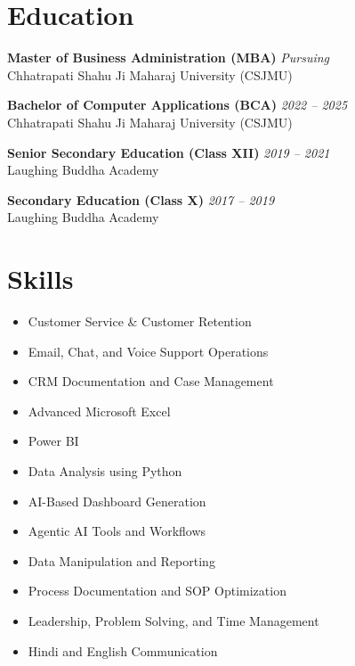\documentclass[11pt,a4paper]{article}
\begin{document}
\section*{Education}

\textbf{Master of Business Administration (MBA)} \hfill \textit{Pursuing}\\
Chhatrapati Shahu Ji Maharaj University (CSJMU)

\vspace{4pt}

\textbf{Bachelor of Computer Applications (BCA)} \hfill \textit{2022 -- 2025}\\
Chhatrapati Shahu Ji Maharaj University (CSJMU)

\vspace{4pt}

\textbf{Senior Secondary Education (Class XII)} \hfill \textit{2019 -- 2021}\\
Laughing Buddha Academy

\vspace{4pt}

\textbf{Secondary Education (Class X)} \hfill \textit{2017 -- 2019}\\
Laughing Buddha Academy

\section*{Skills}
\begin{itemize}[leftmargin=*]
\item Customer Service \& Customer Retention
\item Email, Chat, and Voice Support Operations
\item CRM Documentation and Case Management
\item Advanced Microsoft Excel
\item Power BI
\item Data Analysis using Python
\item AI-Based Dashboard Generation
\item Agentic AI Tools and Workflows
\item Data Manipulation and Reporting
\item Process Documentation and SOP Optimization
\item Leadership, Problem Solving, and Time Management
\item Hindi and English Communication
\end{itemize}
\end{document}
